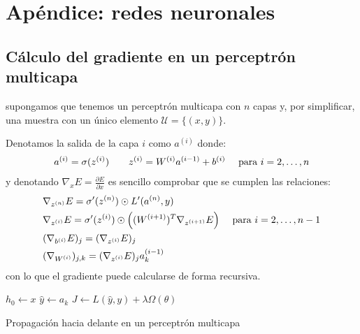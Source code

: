 \chapter{Apéndice: redes neuronales}
\section{Cálculo del gradiente en un perceptrón multicapa}
supongamos que tenemos un perceptrón multicapa con \( n \) capas y, por simplificar, una muestra con un único elemento \( \mathcal{U} = \{ (x, y) \} \). 

Denotamos la salida de la capa \( i \) como \( a^{(i)} \) donde:
\begin{align*}
    a^{(i)} = \sigma(z^{(i)}) & \qquad  z^{(i)} = W^{(i)} a^{(i-1)} + b^{(i)} & \text{ para \( i = 2, \dots, n\)}
\end{align*}
y denotando \( \nabla_x E = \frac{\partial E}{\partial x} \) es sencillo comprobar que se cumplen las relaciones:
\begin{align*}
    &\nabla_{z^{(n)}} E = \sigma'(z^{(n)}) \odot L'(a^{(n)}, y) \\
    &\nabla_{z^{(i)}} E = \sigma'(z^{(i)}) \odot \left( (W^{(i+1)})^T \nabla_{z^{(i + 1)}} E \right) & \text{ para \( i = 2, \dots, n-1\)} \\
    &(\nabla_{b^{(i)}} E)_j = (\nabla_{z^{(i)}} E)_j \\
    &(\nabla_{W^{(i)}})_{j, k} = (\nabla_{z^{(i)}} E)_j a^{(i -1)}_k
\end{align*}
con lo que el gradiente puede calcularse de forma recursiva.

\begin{algorithm}[tb]
    \SetAlgoLined
    $h_{0} \gets x $\;
    $\widehat{y} \gets a_{k}$\;
    $J \gets L(\widehat{y}, y) + \lambda \Omega(\theta)$\;
    \caption{Propagación hacia delante en un perceptrón multicapa}
    \label{algo:forward}
\end{algorithm}

